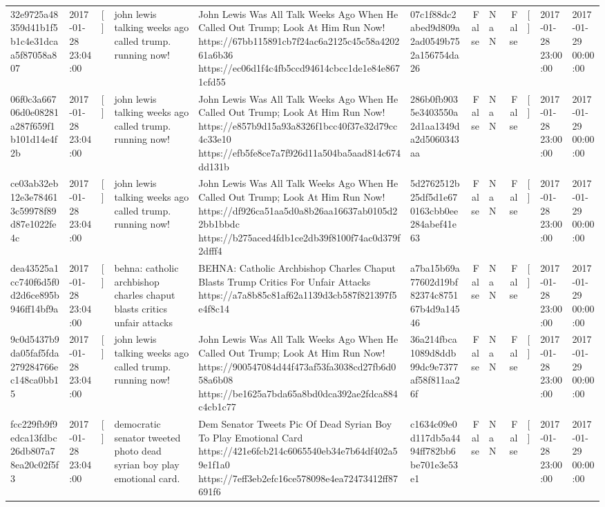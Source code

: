 \begin{tabular}{llllllrlrlll}
32e9725a48359d41b1f5b1c4e31dcaa5f87058a807 & 2017-01-28 23:04:00 & [] & john lewis talking weeks ago called trump. running now! & John Lewis Was All Talk Weeks Ago When He Called Out Trump; Look At Him Run Now! https://67bb115891cb7f24ac6a2125c45c58a420261a6b36 https://ec06d1f4c4fb5ccd94614cbcc1de1e84e8671cfd55 & 07c1f88dc2abed9d809a2ad0549b752a156754da26 & False & NaN & False & [] & 2017-01-28 23:00:00 & 2017-01-29 00:00:00 \\
06f0c3a66706d0e08281a287f659f1b101d14e4f2b & 2017-01-28 23:04:00 & [] & john lewis talking weeks ago called trump. running now! & John Lewis Was All Talk Weeks Ago When He Called Out Trump; Look At Him Run Now! https://e857b9d15a93a8326f1bcc40f37e32d79cc4c33e10 https://efb5fe8ce7a7f926d11a504ba5aad814c674dd131b & 286b0fb9035e3403550a2d1aa1349da2d5060343aa & False & NaN & False & [] & 2017-01-28 23:00:00 & 2017-01-29 00:00:00 \\
ce03ab32eb12e3e784613c59978f89d87e1022fe4c & 2017-01-28 23:04:00 & [] & john lewis talking weeks ago called trump. running now! & John Lewis Was All Talk Weeks Ago When He Called Out Trump; Look At Him Run Now! https://df926ca51aa5d0a8b26aa16637ab0105d22bb1bbdc https://b275aced4fdb1ce2db39f8100f74ac0d379f2dfff4 & 5d2762512b25df5d1e670163cbb0ee284abef41e63 & False & NaN & False & [] & 2017-01-28 23:00:00 & 2017-01-29 00:00:00 \\
dea43525a1cc740f6d5f0d2d6ce895b946ff14bf9a & 2017-01-28 23:04:00 & [] & behna: catholic archbishop charles chaput blasts critics unfair attacks & BEHNA: Catholic Archbishop Charles Chaput Blasts Trump Critics For Unfair Attacks https://a7a8b85c81af62a1139d3cb587f821397f5e4f8c14 & a7ba15b69a77602d19bf82374c875167b4d9a14546 & False & NaN & False & [] & 2017-01-28 23:00:00 & 2017-01-29 00:00:00 \\
9c0d5437b9da05faf5fda279284766ec148ca0bb15 & 2017-01-28 23:04:00 & [] & john lewis talking weeks ago called trump. running now! & John Lewis Was All Talk Weeks Ago When He Called Out Trump; Look At Him Run Now! https://900547084d44f473af53fa3038cd27fb6d058a6b08 https://be1625a7bda65a8bd0dca392ae2fdca884c4cb1c77 & 36a214fbca1089d8ddb99dc9e7377af58f811aa26f & False & NaN & False & [] & 2017-01-28 23:00:00 & 2017-01-29 00:00:00 \\
fcc229fb9f9edca13fdbc26db807a78ea20c02f5f3 & 2017-01-28 23:04:00 & [] & democratic senator tweeted photo dead syrian boy play emotional card. & Dem Senator Tweets Pic Of Dead Syrian Boy To Play Emotional Card https://421e6fcb214c6065540eb34e7b64df402a59e1f1a0 https://7eff3eb2efc16ce578098e4ea72473412ff87691f6 & c1634c09e0d117db5a4494ff782bb6be701e3e53e1 & False & NaN & False & [] & 2017-01-28 23:00:00 & 2017-01-29 00:00:00 \\

\end{tabular}
